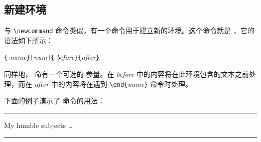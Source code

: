 \subsection{新建环境}

与 \verb|\newcommand| 命令类似，有一个命令用于建立新的环境。这个命令就是
 ，它的语法如下所示：

\begin{lscommand}
\verb|{|%
       \emph{name}\verb|}[|\emph{num}\verb|]{|%
       \emph{before}\verb|}{|\emph{after}\verb|}|
\end{lscommand}

同样地， 命有一个可选的
参量。在 \emph{before} 中的内容将在此环境包含的文本之前处理，而在
 \emph{after} 中的内容将在遇到 \verb|\end{|\emph{name}\verb|}| 命令时处理。

%

下面的例子演示了  命令的用法：
\begin{example}
\newenvironment{king}
{\rule{1ex}{1ex}%
     \hspace{\stretch{1}}}
{%
     \rule{1ex}{1ex}}

\begin{king}
My humble subjects \ldots
\end{king}
\end{example}

